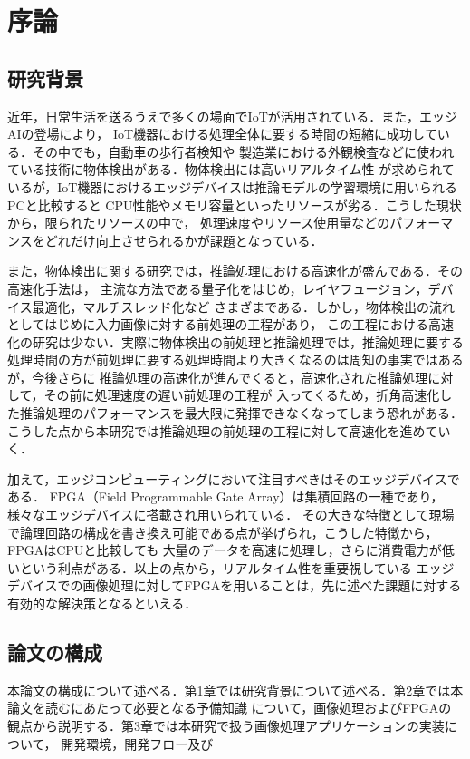 \documentclass[11pt,a4j]{jreport}
\begin{document}
\chapter{序論} %

\section{研究背景}

近年，日常生活を送るうえで多くの場面でIoTが活用されている．また，エッジAIの登場により，
IoT機器における処理全体に要する時間の短縮に成功している．その中でも，自動車の歩行者検知や
製造業における外観検査などに使われている技術に物体検出がある．物体検出には高いリアルタイム性
が求められているが，IoT機器におけるエッジデバイスは推論モデルの学習環境に用いられるPCと比較すると
CPU性能やメモリ容量といったリソースが劣る．こうした現状から，限られたリソースの中で，
処理速度やリソース使用量などのパフォーマンスをどれだけ向上させられるかが課題となっている．

また，物体検出に関する研究では，推論処理における高速化が盛んである．その高速化手法は，
主流な方法である量子化をはじめ，レイヤフュージョン，デバイス最適化，マルチスレッド化など
さまざまである．しかし，物体検出の流れとしてはじめに入力画像に対する前処理の工程があり，
この工程における高速化の研究は少ない．実際に物体検出の前処理と推論処理では，推論処理に要する
処理時間の方が前処理に要する処理時間より大きくなるのは周知の事実ではあるが，今後さらに
推論処理の高速化が進んでくると，高速化された推論処理に対して，その前に処理速度の遅い前処理の工程が
入ってくるため，折角高速化した推論処理のパフォーマンスを最大限に発揮できなくなってしまう恐れがある．
こうした点から本研究では推論処理の前処理の工程に対して高速化を進めていく．

加えて，エッジコンピューティングにおいて注目すべきはそのエッジデバイスである．
FPGA（Field Programmable Gate Array）は集積回路の一種であり，様々なエッジデバイスに搭載され用いられている．
その大きな特徴として現場で論理回路の構成を書き換え可能である点が挙げられ，こうした特徴から，FPGAはCPUと比較しても
大量のデータを高速に処理し，さらに消費電力が低いという利点がある．以上の点から，リアルタイム性を重要視している
エッジデバイスでの画像処理に対してFPGAを用いることは，先に述べた課題に対する有効的な解決策となるといえる．


\section{論文の構成}

本論文の構成について述べる．第1章では研究背景について述べる．第2章では本論文を読むにあたって必要となる予備知識
について，画像処理およびFPGAの観点から説明する．第3章では本研究で扱う画像処理アプリケーションの実装について，
開発環境，開発フロー及び
%
\end{document}
